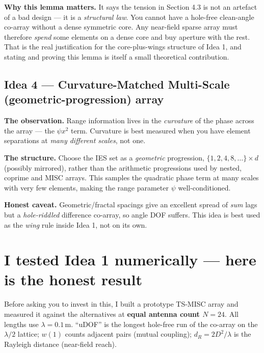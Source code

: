 \documentclass[11pt]{article}
\begin{document}
\textbf{Why this lemma matters.} It says the tension in Section 4.3 is not an artefact of a bad
design --- it is a \emph{structural law}. You cannot have a hole-free clean-angle co-array without a
dense symmetric core. Any near-field sparse array must therefore \emph{spend} some elements on a
dense core and buy aperture with the rest. That is the real justification for the core-plus-wings
structure of Idea 1, and stating and proving this lemma is itself a small theoretical contribution.

\subsection{Idea 4 --- Curvature-Matched Multi-Scale (geometric-progression) array}

\begin{ideabox}
\textbf{The observation.} Range information lives in the \emph{curvature} of the phase across the
array --- the $\psi x^2$ term. Curvature is best measured when you have element separations at
\emph{many different scales}, not one.

\textbf{The structure.} Choose the IES set as a \emph{geometric} progression,
$\{1,2,4,8,\dots\}\times d$ (possibly mirrored), rather than the arithmetic progressions used by
nested, coprime and MISC arrays. This samples the quadratic phase term at many scales with very few
elements, making the range parameter $\psi$ well-conditioned.
\end{ideabox}

\textbf{Honest caveat.} Geometric/fractal spacings give an excellent spread of \emph{sum} lags but a
\emph{hole-riddled} difference co-array, so angle DOF suffers. This idea is best used as the
\emph{wing} rule inside Idea 1, not on its own.

\section{I tested Idea 1 numerically --- here is the honest result}

Before asking you to invest in this, I built a prototype TS-MISC array and measured it against the
alternatives at \textbf{equal antenna count $N=24$}. All lengths use $\lambda=0.1$\,m. ``uDOF'' is
the longest hole-free run of the co-array on the $\lambda/2$ lattice; $w(1)$ counts adjacent pairs
(mutual coupling); $d_R=2D^2/\lambda$ is the Rayleigh distance (near-field reach).
\end{document}
